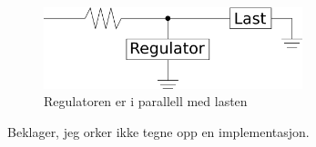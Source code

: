 \begin{figure}[H]
  \centering
  \includegraphics[width=0.67\textwidth]{./img/parallell-boks}
  \caption{Regulatoren er i parallell med lasten}
\end{figure}

Beklager, jeg orker ikke tegne opp en implementasjon.

